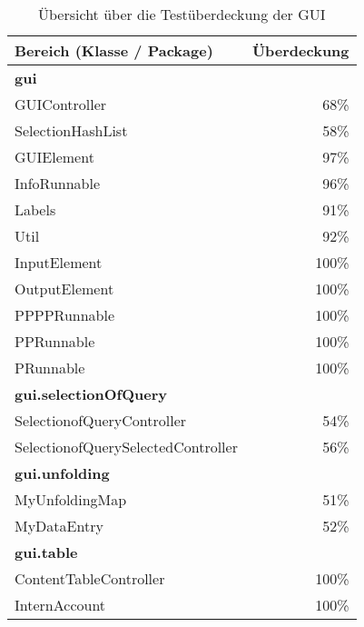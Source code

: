 \begin{table}[h]
	\centering
	\begin{tabular} {l||r}
		\label{tbl:coverageGui}
		Bereich (Klasse / Package) & Überdeckung \\
		\hline
		\hline
		\textbf{gui} \\
		\hspace*{3mm}GUIController & 68\% \\
		\hspace*{3mm}SelectionHashList & 58\% \\
		\hspace*{3mm}GUIElement & 97\% \\
		\hspace*{3mm}InfoRunnable & 96\% \\
		\hspace*{3mm}Labels & 91\% \\
		\hspace*{3mm}Util & 92\% \\
		\hspace*{3mm}InputElement & 100\% \\
		\hspace*{3mm}OutputElement & 100\% \\
		\hspace*{3mm}PPPPRunnable & 100\% \\
		\hspace*{3mm}PPRunnable & 100\% \\
		\hspace*{3mm}PRunnable & 100\% \\
		\hline
		\textbf{gui.selectionOfQuery} \\
		\hspace*{3mm}SelectionofQueryController & 54\% \\
		\hspace*{3mm}SelectionofQuerySelectedController & 56\% \\
		\hline
		\textbf{gui.unfolding} \\
		\hspace*{3mm}MyUnfoldingMap & 51\% \\
		\hspace*{3mm}MyDataEntry & 52\% \\
		\hline
		\textbf{gui.table} \\
		\hspace*{3mm}ContentTableController & 100\% \\
		\hspace*{3mm}InternAccount & 100\% \\
	\end{tabular}
	\caption{Übersicht über die Testüberdeckung der GUI}
\end{table}
